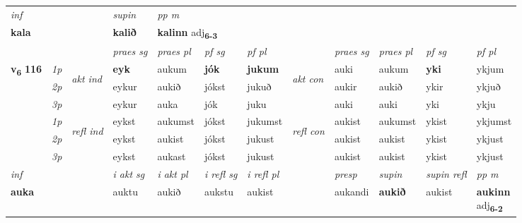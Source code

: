 \begin{longtable}[l]{X>{\footnotesize\itshape}llXXXXlXXXX}
\cmidrule{4-7}
   {\textit{inf}} & &      & \textit{supin}  & \textit{pp m} \\*
  {\textbf{kala}} & &      &  \textbf{kalið}  & \multicolumn{2}{l}{\textbf{kalinn} adj\textbf{\textsubscript{6-3}}} \\*

\midrule

 & &   & \textit{praes sg}  & \textit{praes pl}    & \textit{ pf sg} & \textit{pf pl} & & \textit{praes sg}  & \textit{praes pl}    & \textit{pf sg} & \textit{pf pl }  \\ \cmidrule{4-7} \cmidrule{9-12}
 \multirow{2}{*}{{{\textbf{v{\textsubscript{6}}} \Large{\textbf{116}}}}}  & 1p & \multirow{3}{*}{\begin{turn}{90}\textit{akt ind}\end{turn}} & \textbf{eyk} & aukum & \textbf{jók} & \textbf{jukum} & \multirow{3}{*}{\begin{turn}{90}\textit{akt con}\end{turn}} &auki & aukum & \textbf{yki} & ykjum\\*
 & 2p &  &  eykur  & aukið & jókst & jukuð & & aukir & aukið & ykir & ykjuð \\*
 & 3p &  & eykur & auka & jók & juku & & auki & auki& yki & ykju \\*
\cmidrule{4-7} \cmidrule{9-12}
 & 1p & \multirow{3}{*}{\begin{turn}{90}\textit{refl ind}\end{turn}}  & eykst & aukumst & jókst & jukumst & \multirow{3}{*}{\begin{turn}{90}\textit{refl con}\end{turn}}  &aukist & aukumst & ykist & ykjumst \\*
 & 2p &  & eykst & aukist & jókst & jukust & &aukist & aukist & ykist & ykjust \\*
 & 3p  & & eykst & aukast & jókst & jukust & & aukist & aukist& ykist & ykjust \\*
\cmidrule{4-7} \cmidrule{9-12}

   {\textit{inf}} & &  & \textit{i akt sg} & \textit{i akt pl} & \textit{i refl sg} & \textit{i refl pl} && \textit{presp} & \textit{supin} & \textit{supin refl} & \textit{pp m} \\*
  {\textbf{auka}} & && auktu  & aukið & aukstu & aukist && aukandi &  \textbf{aukið} & aukist & \specialcell{\textbf{aukinn} \\ adj\textbf{\textsubscript{6-2}}} \\*


\end{longtable}

